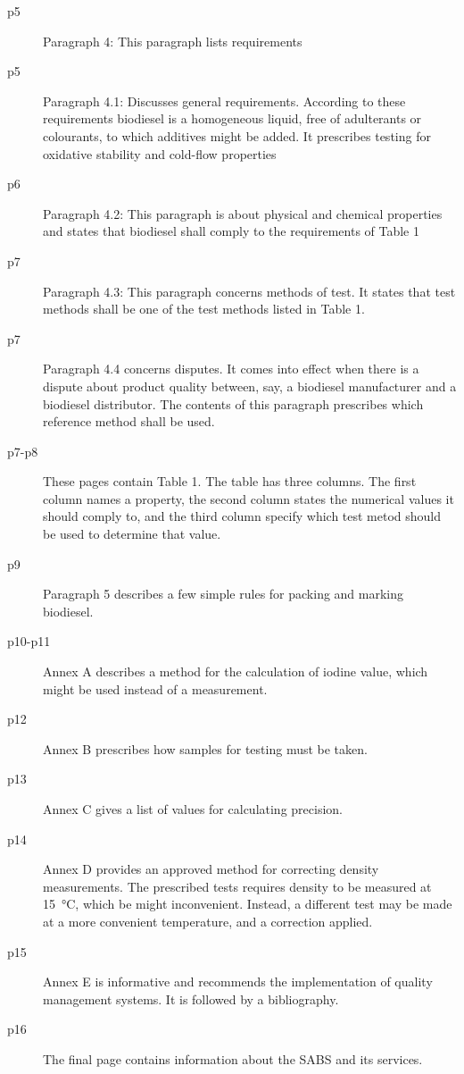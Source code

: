 \begin{description}
\item[p5]{Paragraph 4: This paragraph lists requirements} 

\item[p5]{Paragraph 4.1: Discusses general requirements. According to these
requirements biodiesel is a homogeneous liquid, free of adulterants or
colourants, to which additives might be added. It prescribes testing for
oxidative stability and cold-flow properties}

\item[p6]{Paragraph 4.2: This paragraph is about physical and chemical
properties and states that biodiesel shall comply to the requirements of Table
1}

\item[p7]{Paragraph 4.3: This paragraph concerns methods of test. It states that
test methods shall be  one of the test methods listed in Table 1.}

\item[p7]{Paragraph 4.4 concerns disputes. It comes into effect when there is a
dispute about product quality between, say, a biodiesel manufacturer and a
biodiesel distributor. The contents of this paragraph prescribes which reference
method shall be used.}

\item[p7-p8]{These pages contain Table 1. The table has three columns. The first
column names a property, the second column states the numerical values it should
comply to, and the third column specify which test metod should be used to
determine that value.}

\item[p9]{Paragraph 5 describes a few simple rules for packing and marking biodiesel.}

\item[p10-p11]{Annex A describes a method for the calculation of iodine value,
which might be used instead of a measurement.}

\item[p12]{Annex B prescribes how samples for testing must be taken.}

\item[p13]{Annex C gives a list of values for calculating precision.}

\item[p14]{Annex D provides an approved method for correcting density
measurements. The prescribed tests requires density to be measured at
\SI{15}{\celsius}, which be might inconvenient. Instead, a different test may be
made at a more convenient temperature, and a correction applied. }

\item[p15]{Annex E is informative and recommends the implementation of quality
management systems. It is followed by a bibliography.}

\item[p16]{The final page contains information about the SABS and its services.}

\end{description} 

